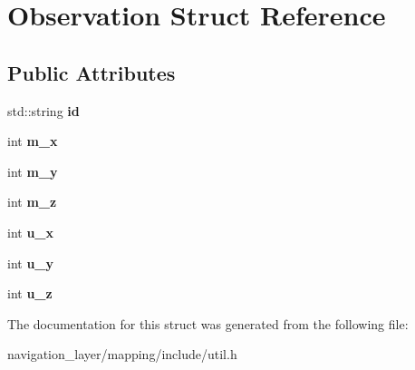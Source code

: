 \hypertarget{structObservation}{}\section{Observation Struct Reference}
\label{structObservation}
\subsection*{Public Attributes}
\begin{DoxyCompactItemize}
\item 
\mbox{\label{structObservation_a3fa8413ddbe7179997e74aab2a2f0af1}} 
std\+::string {\bfseries id}
\item 
\mbox{\label{structObservation_a12eaeea7a3843dcb54da2bb94dec6f0d}} 
int {\bfseries m\+\_\+x}
\item 
\mbox{\label{structObservation_a8e44bae27bba19c334bedd16a76080cb}} 
int {\bfseries m\+\_\+y}
\item 
\mbox{\label{structObservation_a8ed13bbc80cae27bb62182b96dd9c123}} 
int {\bfseries m\+\_\+z}
\item 
\mbox{\label{structObservation_ac814a20a30fc3434bced8543493770d1}} 
int {\bfseries u\+\_\+x}
\item 
\mbox{\label{structObservation_a5ef35caea2cff7d0eacb989659919cbb}} 
int {\bfseries u\+\_\+y}
\item 
\mbox{\label{structObservation_a10c8f97f0fc5b5ebb9ee13d2f8b389a4}} 
int {\bfseries u\+\_\+z}
\end{DoxyCompactItemize}


The documentation for this struct was generated from the following file\+:\begin{DoxyCompactItemize}
\item 
navigation\+\_\+layer/mapping/include/util.\+h\end{DoxyCompactItemize}

